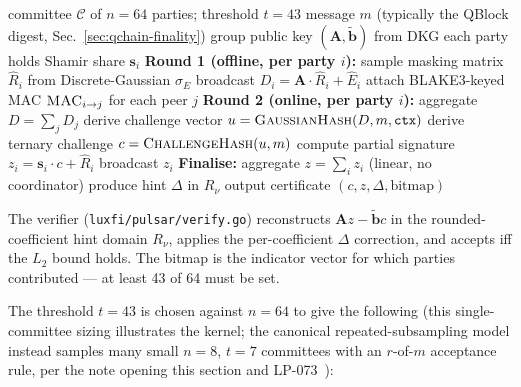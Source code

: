 \begin{algorithm}
\caption{Pulsar-65 two-round signing}
\label{alg:pulsar-two-round}
\begin{algorithmic}[1]
\Require committee $\mathcal{C}$ of $n=64$ parties; threshold $t=43$
\Require message $m$ (typically the QBlock digest, Sec.~\ref{sec:qchain-finality})
\Require group public key $(\mathbf{A}, \tilde{\mathbf{b}})$ from DKG
\Require each party holds Shamir share $\mathbf{s}_i$
\State \textbf{Round 1 (offline, per party $i$):}
\State \hspace{1em} sample masking matrix $\hat{R}_i$ from Discrete-Gaussian $\sigma_E$
\State \hspace{1em} broadcast $D_i = \mathbf{A} \cdot \hat{R}_i + \hat{E}_i$
\State \hspace{1em} attach BLAKE3-keyed MAC $\textsc{MAC}_{i \to j}$ for each peer $j$
\State \textbf{Round 2 (online, per party $i$):}
\State \hspace{1em} aggregate $D = \sum_j D_j$
\State \hspace{1em} derive challenge vector $u = \textsc{GaussianHash}(D, m, \texttt{ctx})$
\State \hspace{1em} derive ternary challenge $c = \textsc{ChallengeHash}(u, m)$
\State \hspace{1em} compute partial signature $z_i = \mathbf{s}_i \cdot c + \hat{R}_i$
\State \hspace{1em} broadcast $z_i$
\State \textbf{Finalise:}
\State \hspace{1em} aggregate $z = \sum_i z_i$ (linear, no coordinator)
\State \hspace{1em} produce hint $\Delta$ in $R_\nu$
\State \hspace{1em} output certificate $(c, z, \Delta, \text{bitmap})$
\end{algorithmic}
\end{algorithm}

The verifier (\texttt{luxfi/pulsar/verify.go}) reconstructs
$\mathbf{A} z - \tilde{\mathbf{b}} c$ in the rounded-coefficient hint domain
$R_\nu$, applies the per-coefficient $\Delta$ correction, and accepts iff the
$L_2$ bound holds. The bitmap is the indicator vector for which parties
contributed --- at least 43 of 64 must be set.

The threshold $t=43$ is chosen against $n=64$ to give the following (this
single-committee sizing illustrates the kernel; the canonical
repeated-subsampling model instead samples many small $n{=}8$, $t{=}7$
committees with an $r$-of-$m$ acceptance rule, per the note opening this
section and LP-073~\cite{lp073}):

